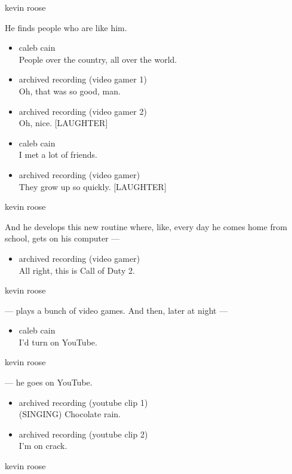 kevin roose

He finds people who are like him.

\begin{itemize}
\item
  caleb cain\\
  People over the country, all over the world.
\item
  archived recording (video gamer 1)\\
  Oh, that was so good, man.
\item
  archived recording (video gamer 2)\\
  Oh, nice. {[}LAUGHTER{]}
\item
  caleb cain\\
  I met a lot of friends.
\item
  archived recording (video gamer)\\
  They grow up so quickly. {[}LAUGHTER{]}
\end{itemize}

kevin roose

And he develops this new routine where, like, every day he comes home
from school, gets on his computer ---

\begin{itemize}
\tightlist
\item
  archived recording (video gamer)\\
  All right, this is Call of Duty 2.
\end{itemize}

kevin roose

--- plays a bunch of video games. And then, later at night ---

\begin{itemize}
\tightlist
\item
  caleb cain\\
  I'd turn on YouTube.
\end{itemize}

kevin roose

--- he goes on YouTube.

\begin{itemize}
\item
  archived recording (youtube clip 1)\\
  (SINGING) Chocolate rain.
\item
  archived recording (youtube clip 2)\\
  I'm on crack.
\end{itemize}

kevin roose

